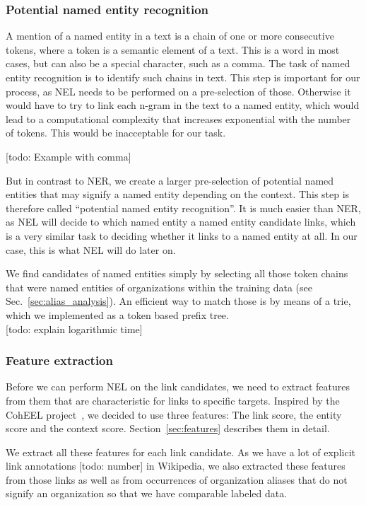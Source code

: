 \subsubsection{Potential named entity recognition}
A mention of a named entity in a text is a chain of one or more consecutive tokens, where a token is a semantic element of a text. This is a word in most cases, but can also be a special character, such as a comma. The task of named entity recognition is to identify such chains in text. This step is important for our process, as NEL needs to be performed on a pre-selection of those. Otherwise it would have to try to link each n-gram in the text to a named entity, which would lead to a computational complexity that increases exponential with the number of tokens. This would be inacceptable for our task.

[todo: Example with comma]

But in contrast to NER, we create a larger pre-selection of potential named entities that may signify a named entity depending on the context. This step is therefore called "`potential named entity recognition"'. It is much easier than NER, as NEL will decide to which named entity a named entity candidate links, which is a very similar task to deciding whether it links to a named entity at all. In our case, this is what NEL will do later on.

We find candidates of named entities simply by selecting all those token chains that were named entities of organizations within the training data (see Sec.~\ref{sec:alias_analysis}). An efficient way to match those is by means of a trie, which we implemented as a token based prefix tree.\\

[todo: explain logarithmic time]


\subsubsection{Feature extraction}
Before we can perform NEL on the link candidates, we need to extract features from them that are characteristic for links to specific targets. Inspired by the CohEEL project~\cite{coheel}, we decided to use three features: The link score, the entity score and the context score. Section~\ref{sec:features} describes them in detail.

We extract all these features for each link candidate. As we have a lot of explicit link annotations [todo: number] in Wikipedia, we also extracted these features from those links as well as from occurrences of organization aliases that do not signify an organization so that we have comparable labeled data.\\


